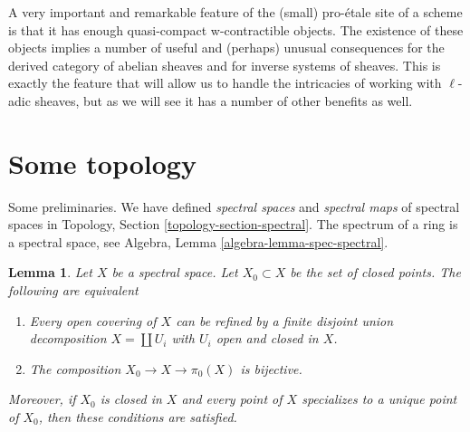 \documentclass{stacks-project}
\theoremstyle{plain}
\newtheorem{lemma}[subsection]{Lemma}
\theoremstyle{definition}
\theoremstyle{remark}
\numberwithin{equation}{subsection}
\begin{document}
\medskip\noindent
A very important and remarkable feature of the
(small) pro-\'etale site of a scheme is
that it has enough quasi-compact w-contractible objects. The existence
of these objects implies
a number of useful and (perhaps) unusual consequences for the derived category
of abelian sheaves and for inverse systems of sheaves.
This is exactly the feature that will allow us to handle
the intricacies of working with $\ell$-adic sheaves, but as we
will see it has a number of other benefits as well.




\section{Some topology}
\label{section-topology}

\noindent
Some preliminaries. We have defined {\it spectral spaces} and
{\it spectral maps} of spectral spaces in
Topology, Section \ref{topology-section-spectral}.
The spectrum of a ring is a spectral space, see
Algebra, Lemma \ref{algebra-lemma-spec-spectral}.

\begin{lemma}
\label{lemma-spectral-split}
Let $X$ be a spectral space. Let $X_0 \subset X$ be the set of closed points.
The following are equivalent
\begin{enumerate}
\item Every open covering of $X$ can be refined by a finite
disjoint union decomposition $X = \coprod U_i$ with $U_i$
open and closed in $X$.
\item The composition $X_0 \to X \to \pi_0(X)$ is bijective.
\end{enumerate}
Moreover, if $X_0$ is closed in $X$ and every point of $X$ specializes
to a unique point of $X_0$, then these conditions are satisfied.
\end{lemma}
\end{document}
